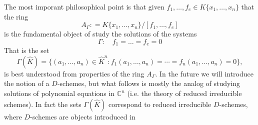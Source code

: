 \documentclass[12pt]{book}
\numberwithin{equation}{section}
\theoremstyle{definition}
\theoremstyle{remark}
\newcommand{\CC}{\mathbb{C}}
\newcommand{\Khat}{\widehat{K}}
\begin{document}
The most imporant philosophical point is that given $f_1,\ldots,f_e \in K\lbrace x_1,\ldots,x_n \rbrace$ that the ring 
 $$ A_{\Gamma} \colon = K\lbrace x_1,\ldots, x_n \rbrace/[f_1,\ldots,f_e] $$
is the fundamental object of study the solutions of the systems 
 $$ \Gamma \colon \quad f_1=\ldots = f_e =0 $$
That is the set 
 $$ \Gamma(\Khat) = \lbrace (a_1,\ldots,a_n) \in \Khat^n \colon f_1(a_1,\ldots,a_n) = \cdots = f_n(a_1,\ldots,a_n) =0 \rbrace,$$
is best understood from properties of the ring $A_{\Gamma}$.
In the future we will introduce the notion of a $D$-schemes, but what follows is mostly the analog of studying solutions of polynomial equations in $\CC^n$ (i.e. the theory of reduced irreducible schemes).
In fact the sets $\Gamma(\Khat)$ correspond to reduced irreducible $D$-schemes, where $D$-schemes are objects introduced in 
\end{document}
